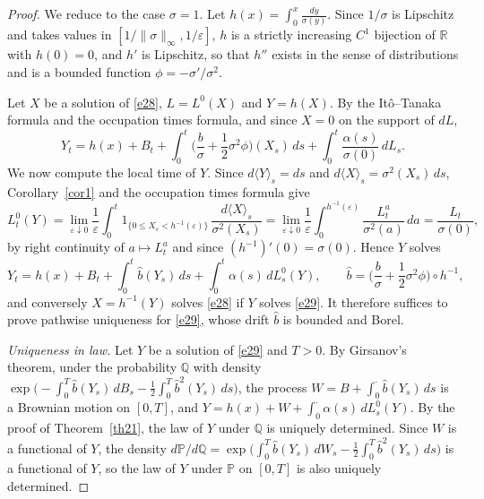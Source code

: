 \begin{proof}
	We reduce to the case $\sigma = 1$. Let $h(x)=\int_0^x \frac{dy}{\sigma (y)}$.
	Since $1/\sigma$ is Lipschitz and takes values in
	$[1/\|\sigma\|_\infty, 1/\varepsilon]$, $h$ is a strictly increasing $C^1$
	bijection of $\mathbb{R}$ with $h(0) = 0$, and $h'$ is Lipschitz, so that $h''$
	exists in the sense of distributions and is a bounded function
	$\phi = -\sigma'/\sigma^2$.

	Let $X$ be a solution of \eqref{e28}, $L = L^0(X)$ and $Y = h(X)$. By the
	It\^o--Tanaka formula and the occupation times formula, and since $X = 0$ on
	the support of $dL$,
	\[
		Y_t = h(x) + B_t + \int_0^t \Big(\frac{b}{\sigma} + \frac{1}{2}\sigma^2\phi\Big)(X_s)\,ds
		+ \int_0^t \frac{\alpha(s)}{\sigma(0)}\,dL_s .
	\]
	We now compute the local time of $Y$. Since $d\langle Y\rangle_s = ds$ and
	$d\langle X\rangle_s = \sigma^2(X_s)\,ds$, Corollary~\ref{cor1} and the
	occupation times formula give
	\[
		L^0_t(Y) = \lim_{\varepsilon\downarrow 0}\frac{1}{\varepsilon}\int_0^t 1_{\{0\leqslant X_s < h^{-1}(\varepsilon)\}}\,
		\frac{d\langle X\rangle_s}{\sigma^2(X_s)}
		= \lim_{\varepsilon\downarrow 0}\frac{1}{\varepsilon}\int_0^{h^{-1}(\varepsilon)} \frac{L^a_t}{\sigma^2(a)}\,da
		= \frac{L_t}{\sigma(0)},
	\]
	by right continuity of $a\mapsto L^a_t$ and since $(h^{-1})'(0) = \sigma(0)$.
	Hence $Y$ solves
	\begin{equation}\label{e29}
		Y_t=h(x)+B_t+\int_0^t \hat{b}(Y_s)\,ds+\int_0^t \alpha (s)\,dL^0_s(Y),
		\qquad
		\hat{b} = \Big(\frac{b}{\sigma}+ \frac{1}{2}\sigma^2 \phi\Big)\circ h^{-1},
	\end{equation}
	and conversely $X = h^{-1}(Y)$ solves \eqref{e28} if $Y$ solves \eqref{e29}.
	It therefore suffices to prove pathwise uniqueness for \eqref{e29}, whose drift
	$\hat{b}$ is bounded and Borel.

	\emph{Uniqueness in law.} Let $Y$ be a solution of \eqref{e29} and $T > 0$.
	By Girsanov's theorem, under the probability $\mathbb{Q}$ with density
	$\exp\big(-\int_0^T \hat{b}(Y_s)\,dB_s - \frac{1}{2}\int_0^T \hat{b}^2(Y_s)\,ds\big)$,
	the process $W = B + \int_0^\cdot \hat{b}(Y_s)\,ds$ is a Brownian motion on
	$[0,T]$, and $Y = h(x) + W + \int_0^\cdot\alpha(s)\,dL^0_s(Y)$. By the proof of
	Theorem~\ref{th21}, the law of $Y$ under $\mathbb{Q}$ is uniquely determined.
	Since $W$ is a functional of $Y$, the density
	$d\mathbb{P}/d\mathbb{Q} = \exp\big(\int_0^T \hat{b}(Y_s)\,dW_s - \frac{1}{2}\int_0^T \hat{b}^2(Y_s)\,ds\big)$
	is a functional of $Y$, so the law of $Y$ under $\mathbb{P}$ on $[0,T]$ is also
	uniquely determined.


\end{proof}
